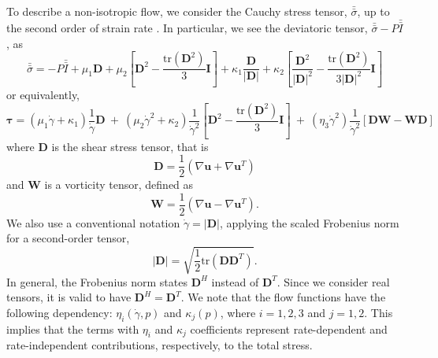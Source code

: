 To describe a non-isotropic flow, we consider the Cauchy stress tensor, $\bar{\bar{\sigma}}$, up to the second order of strain rate \cite{srivastava_viscometric_2021}. In particular, we see the deviatoric tensor, $\bar{\bar{\sigma}} - P \bar{\bar{I}}$, as 
\begin{equation}
  \bar{\bar{\sigma}}
  = -P \bar{\bar{I}}  + \mu_1 {\bm D} 
  + \mu_2  \left[ {\bm D}^2  - \frac{\text{tr}\left({\bm D}^2\right)}{3}{\bm I} \right]
 + \kappa_1 \frac{{\bm D}}{|{\bm D}|} 
  + \kappa_2  \left[ \frac{{\bm D}^2}{|{\bm D}|^2}  
  - \frac{\text{tr}\left({\bm D}^2\right)}{3|{\bm D}|^2}{\bm I} \right]
\end{equation}
or equivalently, 
\begin{equation}
  {\bm {\bm \tau}}
  = \left( \mu_1 \dot{\gamma}+ \kappa_1 \right) \frac{1}{\dot{\gamma}} {\bm D}
  \ +  \ 
  \left( \mu_2  \dot{\gamma}^2
  +  \kappa_2 
  \right) \frac{1}{\dot{\gamma}^2}
  \left[ {\bm D}^2  - \frac{\text{tr}\left({\bm D}^2\right)}{3}{\bm I} \right]
  \ + \
  \left( \eta_3 \dot{\gamma}^2 \right)
  \frac{1}{\dot{\gamma}^2}
    \left[ {\bm D}{\bm W} - {\bm W}{\bm D} \right]
\label{eq_2ndOrder_tau}
\end{equation}
where ${\bm D} $ is the shear stress tensor, that is
\[
	{\bm D} = \frac{1}{2}\left( \nabla {\bm u} + \nabla {\bm u}^{T}\right)	
\]
and ${\bm W}$ is a vorticity tensor, defined as 
\[
	{\bm W} = \frac{1}{2}\left( \nabla {\bm u} - \nabla {\bm u}^{T}\right).
\]
We also use a conventional notation $\dot{\gamma} = \left| {\bm D} \right|$, applying the scaled Frobenius norm for a second-order tensor, 
\[
    |\bm{D}| = \sqrt{\frac{1}{2}
    \text{tr}\left(\bm{D} \bm{D}^{T} \right)}.
\]
In general, the Frobenius norm states $\bm{D}^H$ instead of $\bm{D}^T$. Since we consider real tensors, it is valid to have $\bm{D}^H = \bm{D}^T$.
We note that the flow functions have the following dependency: $\eta_i(\dot{\gamma}, p)$ and $\kappa_j (p)$, where $i = 1,2,3$ and $j = 1,2$. 
This implies that the terms with $\eta_i$ and $\kappa_j$ coefficients represent rate-dependent and rate-independent contributions, respectively, to the total stress.
